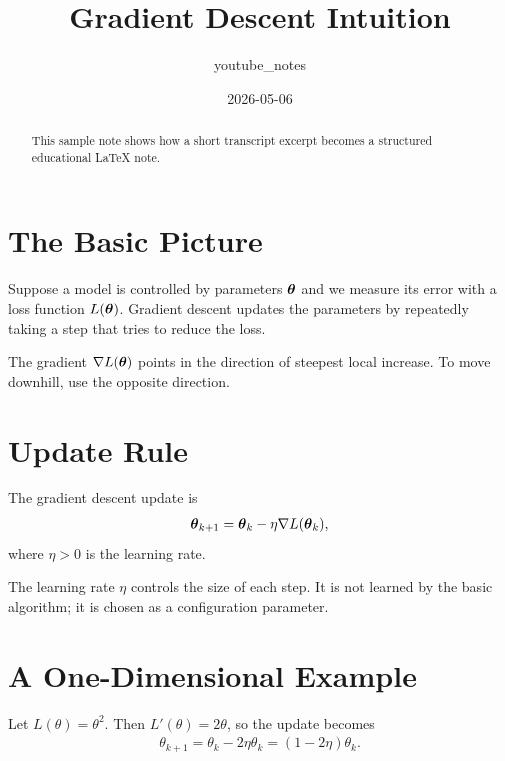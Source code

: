 \documentclass[11pt]{article}
\title{Gradient Descent Intuition}
\author{youtube\_notes}
\date{2026-05-06}
\begin{document}
\maketitle

\begin{abstract}
This sample note shows how a short transcript excerpt becomes a structured educational LaTeX note.
\end{abstract}

\section{The Basic Picture}

Suppose a model is controlled by parameters $\boldsymbol{\theta}$ and we measure its error with a loss function $L(\boldsymbol{\theta})$. Gradient descent updates the parameters by repeatedly taking a step that tries to reduce the loss.

\begin{intuitionbox}
The gradient $\nabla L(\boldsymbol{\theta})$ points in the direction of steepest local increase. To move downhill, use the opposite direction.
\end{intuitionbox}

\section{Update Rule}

The gradient descent update is
\begin{align}
  \boldsymbol{\theta}_{k+1} = \boldsymbol{\theta}_k - \eta \nabla L(\boldsymbol{\theta}_k),
  \label{eq:gradient-descent-update}
\end{align}
where $\eta > 0$ is the learning rate.

\begin{definitionbox}[title=Learning Rate]
The learning rate $\eta$ controls the size of each step. It is not learned by the basic algorithm; it is chosen as a configuration parameter.
\end{definitionbox}

\section{A One-Dimensional Example}

Let $L(\theta) = \theta^2$. Then $L'(\theta)=2\theta$, so the update becomes
\begin{align}
  \theta_{k+1} = \theta_k - 2\eta\theta_k = (1 - 2\eta)\theta_k.
\end{align}
\end{document}
